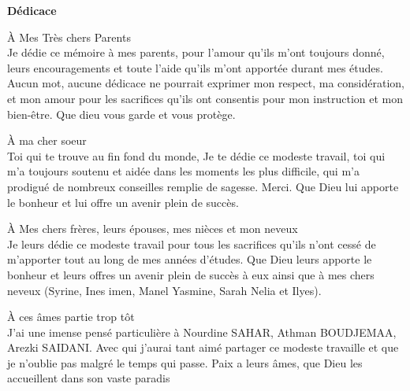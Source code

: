 \documentclass[a4paper,14pt]{report}
\begin{document}
\begin{center}
{\selectfont
\textbf{\Huge Dédicace}\\
\setlength{\parskip}{10ex plus 0.5ex minus 0.2ex}
\large{
À Mes Très chers Parents\\
Je dédie ce mémoire à mes parents, pour l’amour qu’ils m’ont toujours donné, leurs encouragements et toute l’aide qu’ils m’ont apportée durant mes études. Aucun mot, aucune dédicace ne pourrait exprimer mon respect, ma considération, et mon amour pour les sacrifices qu’ils ont consentis pour mon instruction et mon bien-être.
Que dieu vous garde et vous protège. 

À ma cher soeur \\
Toi qui te trouve au fin fond du monde, Je te dédie ce modeste travail, toi qui m'a toujours soutenu et aidée dans les moments les plus difficile, qui m'a prodigué de nombreux conseilles remplie de sagesse. Merci.
Que Dieu lui apporte le bonheur et lui offre un avenir plein de succès.

À Mes chers frères, leurs épouses, mes nièces et mon neveux  \\
Je leurs dédie ce modeste travail pour tous les sacrifices qu’ils n’ont cessé de m’apporter tout au long de mes années d’études. 
Que Dieu leurs apporte le bonheur et leurs offres un avenir plein de
succès à eux ainsi que à mes chers neveux (Syrine, Ines imen, Manel Yasmine, Sarah Nelia et Ilyes).

À ces âmes partie trop tôt \\
J'ai une imense pensé particulière à Nourdine SAHAR, Athman BOUDJEMAA, Arezki SAIDANI. Avec qui j'aurai tant aimé partager ce modeste travaille et que je n'oublie pas malgré le temps qui passe.  
Paix a leurs âmes, que Dieu les accueillent dans son vaste paradis
}
}
\end{center}
\end{document}
